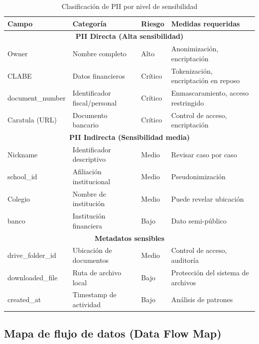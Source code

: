 \begin{table}[H]
\centering
\begin{tabular}{l l l p{4.5cm}}
\toprule
\textbf{Campo} & \textbf{Categoría} & \textbf{Riesgo} & \textbf{Medidas requeridas} \\
\midrule
\multicolumn{4}{c}{\textbf{PII Directa (Alta sensibilidad)}} \\
\midrule
Owner & Nombre completo & Alto & Anonimización, encriptación \\
CLABE & Datos financieros & Crítico & Tokenización, encriptación en reposo \\
document\_number & Identificador fiscal/personal & Crítico & Enmascaramiento, acceso restringido \\
Caratula (URL) & Documento bancario & Crítico & Control de acceso, encriptación \\
\midrule
\multicolumn{4}{c}{\textbf{PII Indirecta (Sensibilidad media)}} \\
\midrule
Nickname & Identificador descriptivo & Medio & Revisar caso por caso \\
school\_id & Afiliación institucional & Medio & Pseudonimización \\
Colegio & Nombre de institución & Medio & Puede revelar ubicación \\
banco & Institución financiera & Bajo & Dato semi-público \\
\midrule
\multicolumn{4}{c}{\textbf{Metadatos sensibles}} \\
\midrule
drive\_folder\_id & Ubicación de documentos & Medio & Control de acceso, auditoría \\
downloaded\_file & Ruta de archivo local & Bajo & Protección del sistema de archivos \\
created\_at & Timestamp de actividad & Bajo & Análisis de patrones \\
\bottomrule
\end{tabular}
\caption{Clasificación de PII por nivel de sensibilidad}
\label{tab:clasificacion_pii}
\end{table}

\subsection{Mapa de flujo de datos (Data Flow Map)}

